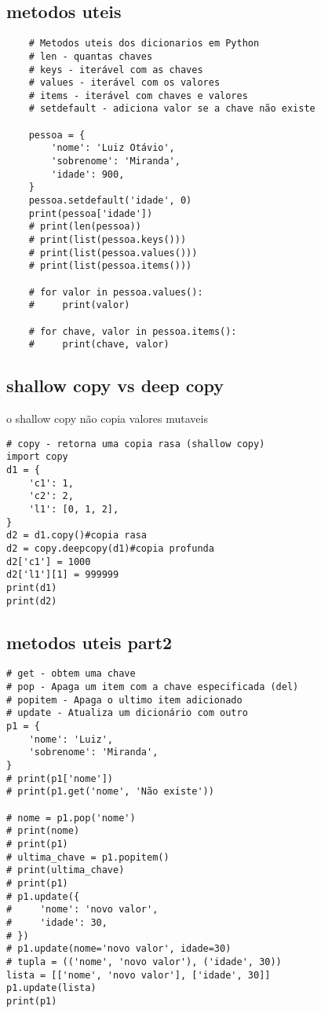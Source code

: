 \documentclass{article}
\begin{document}
\subsection{metodos uteis}
\begin{lstlisting}
    # Metodos uteis dos dicionarios em Python
    # len - quantas chaves
    # keys - iterável com as chaves
    # values - iterável com os valores
    # items - iterável com chaves e valores
    # setdefault - adiciona valor se a chave não existe
    
    pessoa = {
        'nome': 'Luiz Otávio',
        'sobrenome': 'Miranda',
        'idade': 900,
    }
    pessoa.setdefault('idade', 0)
    print(pessoa['idade'])
    # print(len(pessoa))
    # print(list(pessoa.keys()))
    # print(list(pessoa.values()))
    # print(list(pessoa.items()))
    
    # for valor in pessoa.values():
    #     print(valor)
    
    # for chave, valor in pessoa.items():
    #     print(chave, valor)  
\end{lstlisting}
\subsection{shallow copy vs deep copy}
o shallow copy não copia valores mutaveis  
\begin{lstlisting} 
# copy - retorna uma copia rasa (shallow copy)
import copy
d1 = {
    'c1': 1,
    'c2': 2,
    'l1': [0, 1, 2],
}
d2 = d1.copy()#copia rasa
d2 = copy.deepcopy(d1)#copia profunda
d2['c1'] = 1000
d2['l1'][1] = 999999
print(d1)
print(d2)
\end{lstlisting}
\subsection{metodos uteis part2}
\begin{lstlisting}
# get - obtem uma chave
# pop - Apaga um item com a chave especificada (del)
# popitem - Apaga o ultimo item adicionado
# update - Atualiza um dicionário com outro
p1 = {
    'nome': 'Luiz',
    'sobrenome': 'Miranda',
}
# print(p1['nome'])
# print(p1.get('nome', 'Não existe'))

# nome = p1.pop('nome')
# print(nome)
# print(p1)
# ultima_chave = p1.popitem()
# print(ultima_chave)
# print(p1)
# p1.update({
#     'nome': 'novo valor',
#     'idade': 30,
# })
# p1.update(nome='novo valor', idade=30)
# tupla = (('nome', 'novo valor'), ('idade', 30))
lista = [['nome', 'novo valor'], ['idade', 30]]
p1.update(lista)
print(p1)
\end{lstlisting}
\end{document}
